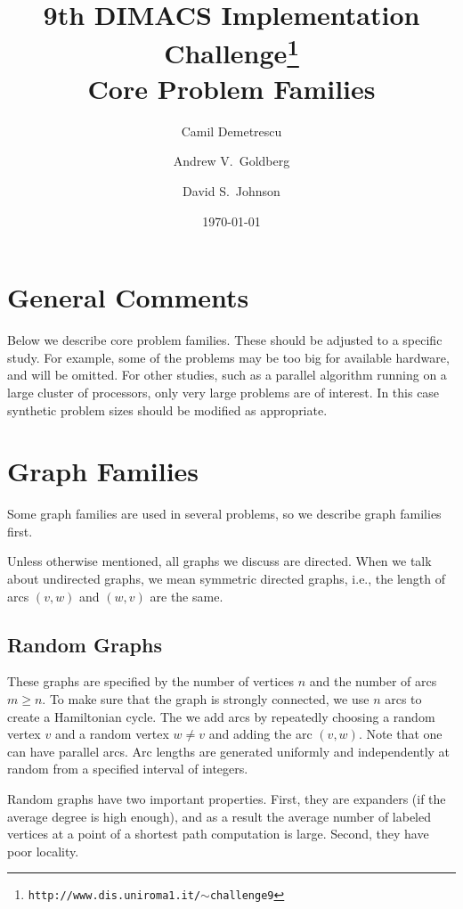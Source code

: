 \documentclass[11pt]{article}
\begin{document}
\title{9th DIMACS Implementation Challenge\footnote{\tt http://www.dis.uniroma1.it/$\sim$challenge9}\\ Core Problem Families}

\author{
Camil Demetrescu
\and
Andrew V.\ Goldberg
\and
David S.\ Johnson
}

\date{\today}

\maketitle

\section{General Comments}

Below we describe core problem families.
These should be adjusted to a specific study.
For example, some of the problems may be too big for available
hardware, and will be omitted.
For other studies, such as a parallel algorithm running on
a large cluster of processors, only very large problems
are of interest.
In this case synthetic problem sizes should be modified as
appropriate.

\section{Graph Families}

Some graph families are used in several problems, so we describe
graph families first.

Unless otherwise mentioned, all graphs we discuss are directed.
When we talk about undirected graphs, we mean symmetric directed
graphs, i.e., the length of arcs $(v,w)$ and $(w,v)$ are the same.

\subsection{Random Graphs}
These graphs are specified by the number of vertices $n$ and
the number of arcs $m \geq n$.
To make sure that the graph is strongly connected, we use $n$
arcs to create a Hamiltonian cycle. The we add arcs by
repeatedly choosing a random vertex $v$ and a random vertex $w \not = v$
and adding the arc $(v,w)$.
Note that one can have parallel arcs.
Arc lengths are generated uniformly and independently at random from a
specified interval of integers.

Random graphs have two important properties.
First, they are expanders (if the average degree is high enough), and
as a result the average number of labeled vertices at a point of a
shortest path computation is large.
Second, they have poor locality.
\end{document}
